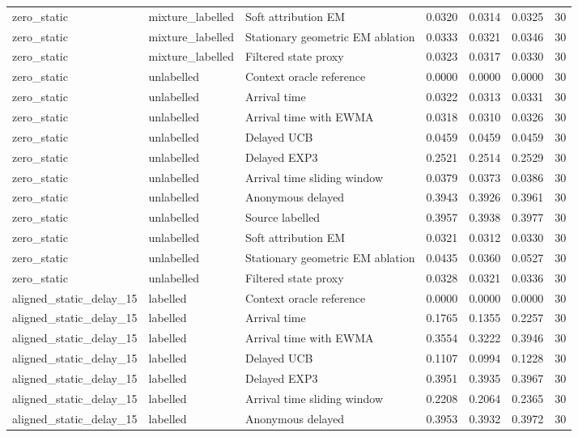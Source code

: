 \begin{tabular}{llllllr}
zero\_static & mixture\_labelled & Soft attribution EM & 0.0320 & 0.0314 & 0.0325 & 30 \\
zero\_static & mixture\_labelled & Stationary geometric EM ablation & 0.0333 & 0.0321 & 0.0346 & 30 \\
zero\_static & mixture\_labelled & Filtered state proxy & 0.0323 & 0.0317 & 0.0330 & 30 \\
zero\_static & unlabelled & Context oracle reference & 0.0000 & 0.0000 & 0.0000 & 30 \\
zero\_static & unlabelled & Arrival time & 0.0322 & 0.0313 & 0.0331 & 30 \\
zero\_static & unlabelled & Arrival time with EWMA & 0.0318 & 0.0310 & 0.0326 & 30 \\
zero\_static & unlabelled & Delayed UCB & 0.0459 & 0.0459 & 0.0459 & 30 \\
zero\_static & unlabelled & Delayed EXP3 & 0.2521 & 0.2514 & 0.2529 & 30 \\
zero\_static & unlabelled & Arrival time sliding window & 0.0379 & 0.0373 & 0.0386 & 30 \\
zero\_static & unlabelled & Anonymous delayed & 0.3943 & 0.3926 & 0.3961 & 30 \\
zero\_static & unlabelled & Source labelled & 0.3957 & 0.3938 & 0.3977 & 30 \\
zero\_static & unlabelled & Soft attribution EM & 0.0321 & 0.0312 & 0.0330 & 30 \\
zero\_static & unlabelled & Stationary geometric EM ablation & 0.0435 & 0.0360 & 0.0527 & 30 \\
zero\_static & unlabelled & Filtered state proxy & 0.0328 & 0.0321 & 0.0336 & 30 \\
aligned\_static\_delay\_15 & labelled & Context oracle reference & 0.0000 & 0.0000 & 0.0000 & 30 \\
aligned\_static\_delay\_15 & labelled & Arrival time & 0.1765 & 0.1355 & 0.2257 & 30 \\
aligned\_static\_delay\_15 & labelled & Arrival time with EWMA & 0.3554 & 0.3222 & 0.3946 & 30 \\
aligned\_static\_delay\_15 & labelled & Delayed UCB & 0.1107 & 0.0994 & 0.1228 & 30 \\
aligned\_static\_delay\_15 & labelled & Delayed EXP3 & 0.3951 & 0.3935 & 0.3967 & 30 \\
aligned\_static\_delay\_15 & labelled & Arrival time sliding window & 0.2208 & 0.2064 & 0.2365 & 30 \\
aligned\_static\_delay\_15 & labelled & Anonymous delayed & 0.3953 & 0.3932 & 0.3972 & 30 \\

\end{tabular}
